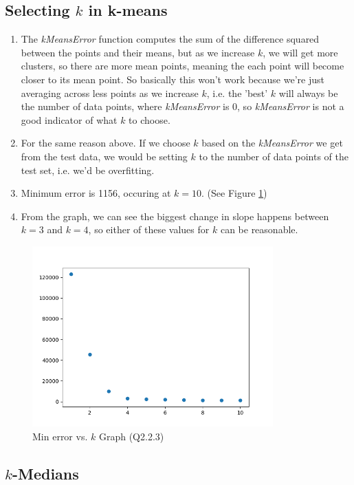 \documentclass{article}
\def\enum#1{\begin{enumerate}#1\end{enumerate}}
\begin{document}
 \subsection{Selecting $k$ in k-means}

 \enum{
 \item The \emph{kMeansError} function computes the sum of the difference squared between the points and their means, but as we increase $k$, we will get more clusters, so there are more mean points, meaning the each point will become closer to its mean point. So basically this won't work because we're just averaging across less points as we increase $k$, i.e. the 'best' $k$ will always be the number of data points, where \emph{kMeansError} is 0, so \emph{kMeansError} is not a good indicator of what $k$ to choose.
 \item For the same reason above. If we choose $k$ based on the \emph{kMeansError} we get from the test data, we would be setting $k$ to the number of data points of the test set, i.e. we'd be overfitting.
 \item Minimum error is 1156, occuring at $k = 10$. (See Figure \ref{fig:q2_2_3})
 \item From the graph, we can see the biggest change in slope happens between $k=3$ and $k=4$, so either of these values for $k$ can be reasonable. 
 }

 \begin{figure}[h!]
    \includegraphics[width=25em]{a2_q2_2_3.png}
    \caption{Min error vs. $k$ Graph (Q2.2.3)}
    \label{fig:q2_2_3}
\end{figure}


 \subsection{$k$-Medians}
 
\end{document}
